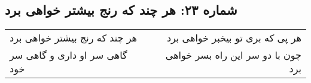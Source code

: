 \begin{center}
\section*{شماره ۲۳: هر چند که رنج بیشتر خواهی برد}
\label{sec:023}
\begin{longtable}{l p{0.5cm} r}
هر چند که رنج بیشتر خواهی برد
&&
هر پی که بری تو بیخبر خواهی برد
\\
گاهی سر او داری و گاهی سر خود
&&
چون با دو سر این راه بسر خواهی برد
\\
\end{longtable}
\end{center}
